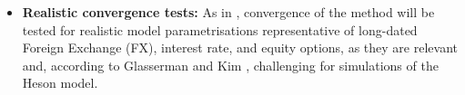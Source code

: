 \documentclass[12,twoside]{mammeTFM}
\theoremstyle{definition}
\theoremstyle{remark}
\begin{document}
\begin{itemize}

\item \textbf{Realistic convergence tests:}
As in \cite{cui17}, convergence of the method will be tested for realistic model parametrisations representative of long-dated Foreign Exchange (FX), interest rate, and equity options, as they are relevant and, according to Glasserman and Kim \cite{gla11}, challenging for simulations of the Heson model.






\end{itemize}
\end{document}
